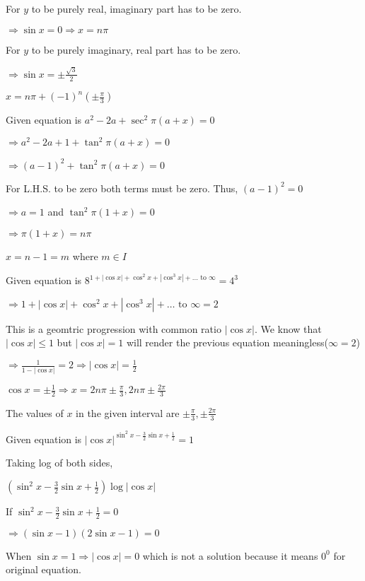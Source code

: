   For $y$ to be purely real, imaginary part has to be zero.

  $\Rightarrow \sin x = 0 \Rightarrow x = n\pi$

  For $y$ to be purely imaginary, real part has to be zero.

  $\Rightarrow \sin x = \pm\frac{\sqrt{3}}{2}$

  $x = n\pi + (-1)^n\left(\pm\frac{\pi}{3}\right)$

\item Given equation is $a^2 - 2a + \sec^2\pi(a + x) = 0$

  $\Rightarrow a^2 - 2a + 1 + \tan^2\pi(a + x) = 0$

  $\Rightarrow (a - 1)^2 + \tan^2\pi(a + x) = 0$

  For L.H.S. to be zero both terms must be zero. Thus, $(a - 1)^2 = 0$

  $\Rightarrow a = 1$ and $\tan^2\pi(1 + x) = 0$

  $\Rightarrow \pi(1 + x) = n\pi$

  $x = n - 1 = m$ where $m\in I$

\item Given equation is $8^{1 + |\cos x| + \cos^2x + |\cos^3 x| + \ldots \text{~to~}\infty} = 4^3$

  $\Rightarrow 1 + |\cos x| + \cos^2x + |\cos^3 x| + \ldots \text{~to~}\infty = 2$

  This is a geomtric progression with common ratio $|\cos x|.$ We know that $|\cos x|\leq 1$ but $|\cos x| =1$
  will render the previous equation meaningless($\infty=2$)

  $\Rightarrow \frac{1}{1 - |\cos x|} = 2 \Rightarrow |\cos x| = \frac{1}{2}$

  $\cos x = \pm\frac{1}{2} \Rightarrow x = 2n\pi\pm\frac{\pi}{3}, 2n\pi\pm\frac{2\pi}{3}$

  The values of $x$ in the given interval are $\pm\frac{\pi}{3}, \pm\frac{2\pi}{3}$

\item Given equation is $|\cos x|^{\sin^2x - \frac{3}{2}\sin x + \frac{1}{2}} = 1$

  Taking log of both sides,

  $\left(\sin^2x - \frac{3}{2}\sin x + \frac{1}{2}\right)\log |\cos x|$

  If $\sin^2x - \frac{3}{2}\sin x + \frac{1}{2} = 0$

  $\Rightarrow (\sin x - 1)(2\sin x - 1) = 0$

  When $\sin x = 1 \Rightarrow |\cos x| = 0$ which is not a solution because it means $0^0$ for original equation.

